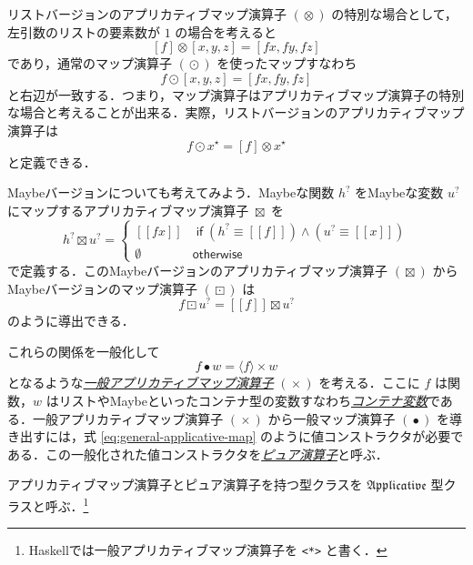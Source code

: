 \documentclass[a4paper]{jsbook}
\def\[{\left[\!\left[}
\def\]{\right]\!\right]}
\newcommand{\programminglanguage}[1]{\textsf{#1}}
\newcommand{\haskell}{\programminglanguage{Haskell}}
\newcommand{\keyword}[1]{{\underline{\emph{#1}}}}
\newcommand{\code}[1]{\texttt{#1}}
\newcommand{\mListWith}[1]{\left[#1\right]}
\newcommand{\mMaybeWith}[1]{\[#1\]}
\newcommand{\mPureWith}[1]{\langle#1\rangle}
\newcommand{\mSpecialTypeClass}[1]{\mathfrak{#1}} %
\newcommand{\mApplicativeTypeClass}{\mSpecialTypeClass{Applicative}}
\newcommand{\mNothing}{\emptyset}
\newcommand{\mKeyword}[1]{\mathsf{#1}}
\newcommand{\mIfKeyword}{\mKeyword{if}}
\newcommand{\mOtherwiseKeyword}{\mKeyword{otherwise}}
\newcommand{\mList}[1]{{#1}^\mathrm{\star}}
\newcommand{\mMaybe}[1]{{#1}^\text{?}}
\DeclareMathOperator{\mMap}{\bullet}
\DeclareMathOperator{\mMapList}{\odot}
\DeclareMathOperator{\mMapMaybe}{\boxdot}
\DeclareMathOperator{\mAppMap}{\times}
\DeclareMathOperator{\mAppMapList}{\otimes}
\DeclareMathOperator{\mAppMapMaybe}{\boxtimes}
\DeclareMathOperator{\mLogicalAnd}{\wedge}
\DeclareMathOperator{\mIf}{\mIfKeyword}
\DeclareMathOperator{\mOtherwise}{\mOtherwiseKeyword}
\begin{document}
リストバージョンのアプリカティブマップ演算子 $(\mAppMapList)$ の特別な場合として，左引数のリストの要素数が $1$ の場合を考えると
\begin{equation}
\mListWith{f}\mAppMapList\mListWith{x,y,z}
=\mListWith{fx,fy,fz}
\end{equation}
であり，通常のマップ演算子 $(\mMapList)$ を使ったマップすなわち
\begin{equation}
f\mMapList\mListWith{x,y,z}
=\mListWith{fx,fy,fz}
\end{equation}
と右辺が一致する．つまり，マップ演算子はアプリカティブマップ演算子の特別な場合と考えることが出来る．実際，リストバージョンのアプリカティブマップ演算子は
\begin{equation}
f\mMapList\mList{x}
=\mListWith{f}\mAppMapList\mList{x}
\end{equation}
と定義できる．

Maybeバージョンについても考えてみよう．Maybeな関数 $\mMaybe{h}$ をMaybeな変数 $\mMaybe{u}$ にマップするアプリカティブマップ演算子 $\mAppMapMaybe$ を
\begin{equation}
\mMaybe{h}\mAppMapMaybe\mMaybe{u}
=\begin{cases}
\mMaybeWith{fx}
&\mIf\left(\mMaybe{h}\equiv\mMaybeWith{f}\right)
\mLogicalAnd
\left(\mMaybe{u}\equiv\mMaybeWith{x}\right)\\
\mNothing&\mOtherwise
\end{cases}
\end{equation}
で定義する．このMaybeバージョンのアプリカティブマップ演算子 $(\mAppMapMaybe)$ からMaybeバージョンのマップ演算子 $(\mMapMaybe)$ は
\begin{equation}
f\mMapMaybe\mMaybe{u}
=\mMaybeWith{f}\mAppMapMaybe\mMaybe{u}
\end{equation}
のように導出できる．

これらの関係を一般化して
\begin{equation}
\label{eq:general-applicative-map}
f\mMap w=\mPureWith{f}\mAppMap w
\end{equation}
となるような\keyword{一般アプリカティブマップ演算子} $(\mAppMap)$ を考える．ここに $f$ は関数，$w$ はリストやMaybeといったコンテナ型の変数すなわち\keyword{コンテナ変数}である．一般アプリカティブマップ演算子 $(\mAppMap)$ から一般マップ演算子 $(\mMap)$ を導き出すには，式 \eqref{eq:general-applicative-map} のように値コンストラクタが必要である．この一般化された値コンストラクタを\keyword{ピュア演算子}と呼ぶ．

アプリカティブマップ演算子とピュア演算子を持つ型クラスを $\mApplicativeTypeClass$ 型クラスと呼ぶ．\footnote{\haskell では一般アプリカティブマップ演算子を \code{<*>} と書く．}
\end{document}
